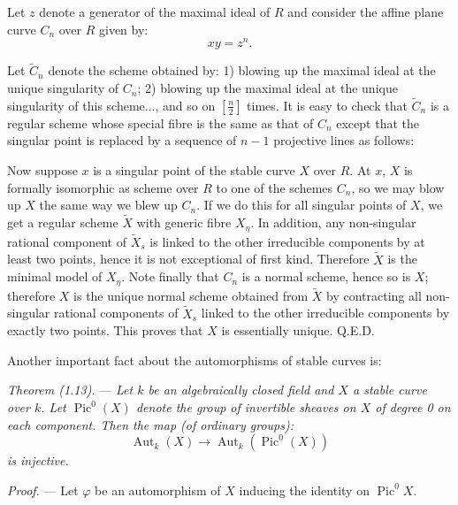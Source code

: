 \documentclass[10pt]{article}
\newcommand{\Aut}{\operatorname{Aut}}
\newcommand{\Pic}{\operatorname{Pic}}
\newcommand{\QED}{\hfill Q.E.D.}
\begin{document}
Let $z$ denote a generator of the maximal ideal of $R$ and consider the affine plane curve $C_n$ over $R$ given by:
\[
xy=z^n.
\]


Let $\widetilde C_n$ denote the scheme obtained by: 1) blowing up the maximal ideal at the unique singularity of $C_n$; 2) blowing up the maximal ideal at the unique singularity of this scheme..., and so on $\left[\frac n2\right]$ times. It is easy to check that $\widetilde C_n$ is a regular scheme whose special fibre is the same as that of $C_n$ except that the singular point is replaced by a sequence of $n-1$ projective lines as follows:

\begin{center}
\end{center}

Now suppose $x$ is a singular point of the stable curve $X$ over $R$. At $x$, $X$ is formally isomorphic as scheme over $R$ to one of the schemes $C_n$, so we may blow up $X$ the same way we blew up $C_n$. If we do this for all singular points of $X$, we get a regular scheme $\widetilde X$ with generic fibre $X_\eta$. In addition, any non-singular rational component of $\widetilde X_s$ is linked to the other irreducible components by at least two points, hence it is not exceptional of first kind. Therefore $\widetilde X$ is the minimal model of $X_\eta$. Note finally that $C_n$ is a normal scheme, hence so is $X$; therefore $X$ is the unique normal scheme obtained from $\widetilde X$ by contracting all non-singular rational components of $\widetilde X_s$ linked to the other irreducible components by exactly two points. This proves that $X$ is essentially unique. \QED

Another important fact about the automorphisms of stable curves is:

\medskip
\noindent\emph{Theorem (1.13).} --- \emph{Let $k$ be an algebraically closed field and $X$ a stable curve over $k$. Let $\Pic^0(X)$ denote the group of invertible sheaves on $X$ of degree 0 on each component. Then the map (of ordinary groups):}
\[
\Aut_k(X)\longrightarrow \Aut_k(\Pic^0(X))
\]
\emph{is injective.}

\noindent\emph{Proof.} --- Let $\varphi$ be an automorphism of $X$ inducing the identity on $\Pic^0X$.
\end{document}
